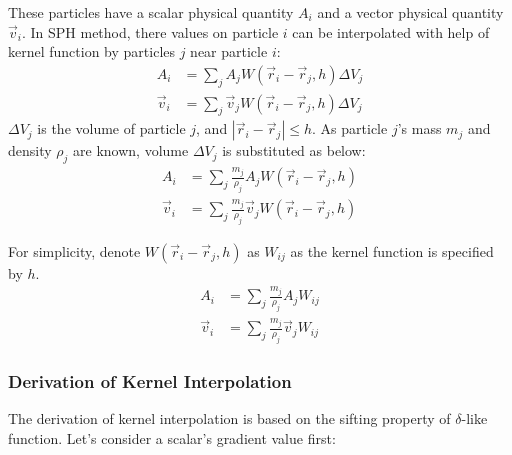 These particles have a scalar physical quantity $A_i$ and a vector physical quantity $\vec{v}_i$.
In SPH method, there values on particle $i$ can be interpolated with help of kernel function by 
particles $j$ near particle $i$:
\begin{equation}
    \begin{aligned}
        A_i &= \sum_j A_j W(\vec{r}_i - \vec{r}_j, h) \Delta V_j \\
        \vec{v}_i &= \sum_j \vec{v}_j W(\vec{r}_i - \vec{r}_j, h) \Delta V_j
    \end{aligned}
\end{equation}
$\Delta V_j$ is the volume of particle $j$, and $|\vec{r}_i - \vec{r}_j| \leq h$. 
As particle $j$'s mass $m_j$ and density $\rho_j$ are known, volume $\Delta V_j$ is substituted as below:
\begin{equation}
    \begin{aligned}
        A_i &= \sum_j \frac{m_j}{\rho_j} A_j W(\vec{r}_i - \vec{r}_j, h) \\
        \vec{v}_i &= \sum_j \frac{m_j}{\rho_j} \vec{v}_j W(\vec{r}_i - \vec{r}_j, h)
    \end{aligned}
\end{equation}

For simplicity, 
denote $W(\vec{r}_i - \vec{r}_j, h)$ as $W_{ij}$ as the kernel function is specified by $h$.
\begin{equation}
    \begin{aligned}
        A_i &= \sum_j \frac{m_j}{\rho_j} A_j W_{ij} \\
        \vec{v}_i &= \sum_j \frac{m_j}{\rho_j} \vec{v}_j W_{ij}
    \end{aligned}
\end{equation}

\subsubsection{Derivation of Kernel Interpolation}

The derivation of kernel interpolation is based on the sifting property of $\delta$-like function.
Let's consider a scalar's gradient value first:

